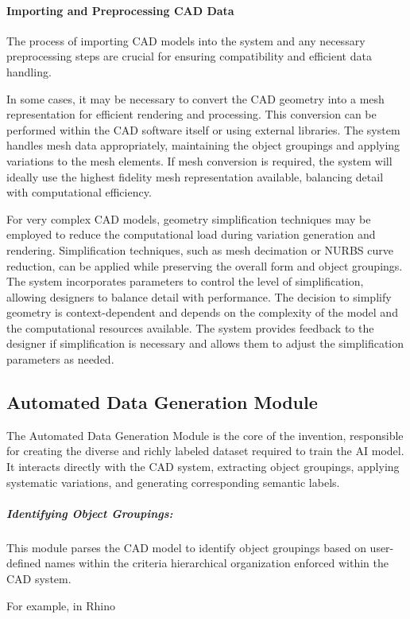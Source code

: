 \documentclass{article}
\begin{document}
\paragraph{Importing and Preprocessing CAD Data}
The process of importing CAD models into the system and any necessary preprocessing steps are crucial for ensuring compatibility and efficient data handling.

In some cases, it may be necessary to convert the CAD geometry into a mesh representation for efficient rendering and processing. This conversion can be performed within the CAD software itself or using external libraries. The system handles mesh data appropriately, maintaining the object groupings and applying variations to the mesh elements. If mesh conversion is required, the system will ideally use the highest fidelity mesh representation available, balancing detail with computational efficiency.

For very complex CAD models, geometry simplification techniques may be employed to reduce the computational load during variation generation and rendering. Simplification techniques, such as mesh decimation or NURBS curve reduction, can be applied while preserving the overall form and object groupings. The system incorporates parameters to control the level of simplification, allowing designers to balance detail with performance. The decision to simplify geometry is context-dependent and depends on the complexity of the model and the computational resources available. The system provides feedback to the designer if simplification is necessary and allows them to adjust the simplification parameters as needed.

\subsection{Automated Data Generation Module}

The Automated Data Generation Module is the core of the invention, responsible for creating the diverse and richly labeled dataset required to train the AI model.  It interacts directly with the CAD system, extracting object groupings, applying systematic variations, and generating corresponding semantic labels.

\subparagraph{Identifying Object Groupings:} This module parses the CAD model to identify object groupings based on user-defined names within the criteria hierarchical organization enforced within the CAD system.

For example, in Rhino
\end{document}
